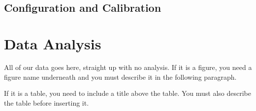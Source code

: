 \documentclass[final,1p, times, twocolumn]{elsarticle}
\begin{document}
\subsection{Configuration and Calibration}

\section{Data Analysis}
\label{Data Analysis}
All of our data goes here, straight up with no analysis.  If it is a figure, you need a figure name underneath and you must describe it in the following paragraph.  

If it is a table, you need to include a title above the table.  You must also describe the table before inserting it.  
\end{document}
